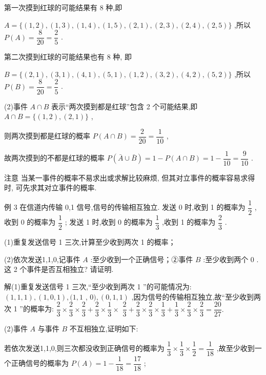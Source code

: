 第一次摸到红球的可能结果有 8 种,即

$A = \{ \left( {1,2}\right) ,\left( {1,3}\right) ,\left( {1,4}\right) ,\left( {1,5}\right) ,\left( {2,1}\right) ,\left( {2,3}\right) ,\left( {2,4}\right) ,\left( {2,5}\right) \}$ ,所以 $P\left( A\right)  = \dfrac{8}{20} = \dfrac{2}{5}$ .

第二次摸到红球的可能结果也有 8 种, 即

$B = \{ \left( {2,1}\right) ,\left( {3,1}\right) ,\left( {4,1}\right) ,\left( {5,1}\right) ,\left( {1,2}\right) ,\left( {3,2}\right) ,\left( {4,2}\right) ,\left( {5,2}\right) \}$ ,所以 $P\left( B\right)  = \dfrac{8}{20} = \dfrac{2}{5}$ .

(2)事件 $A \cap  B$ 表示“两次摸到都是红球”包含 2 个可能结果,即 $A \cap  B = \{ \left( {1,2}\right) ,\left( {2,1}\right) \}$ ,

则两次摸到都是红球的概率 $P\left( {A \cap  B}\right)  = \dfrac{2}{20} = \dfrac{1}{10}$ ,

故两次摸到的不都是红球的概率 $P\left( {\bar{A} \cup  \bar{B}}\right)  = 1 - P\left( {A \cap  B}\right)  = 1 - \dfrac{1}{10} = \dfrac{9}{10}$ .

注意 当某一事件的概率不易求出或求解比较麻烦, 但其对立事件的概率容易求得时, 可先求其对立事件的概率.

例 3 在信道内传输 0,1 信号,信号的传输相互独立. 发送 0 时,收到 1 的概率为 $\dfrac{1}{2}$ ,收到 0 的概率为 $\dfrac{1}{2}$ ; 发送 1 时,收到 0 的概率为 $\dfrac{1}{3}$ ,收到 1 的概率为 $\dfrac{2}{3}$ .

(1)重复发送信号 1 三次,计算至少收到两次 1 的概率；

(2)依次发送1,1,0,记事件 $A$ :至少收到一个正确信号；②事件 $B$ :至少收到两个 0 . 这 2 个事件是否互相独立? 请证明.

解(1)重复发送信号 1 三次,“至少收到两次 1 ”的可能情况为: $\left( {1,1,1}\right) ,\left( {1,0,1}\right) ,(1,1$ , $0),\left( {0,1,1}\right)$ ,因为信号的传输相互独立,故“至少收到两次 1 ”的概率为: $\dfrac{2}{3} \times  \dfrac{2}{3} \times  \dfrac{2}{3} + \dfrac{2}{3} \times  \dfrac{1}{3} \times$  $\dfrac{2}{3} + \dfrac{2}{3} \times  \dfrac{2}{3} \times  \dfrac{1}{3} + \dfrac{1}{3} \times  \dfrac{2}{3} \times  \dfrac{2}{3} = \dfrac{20}{27}.$

(2)事件 $A$ 与事件 $B$ 不互相独立,证明如下:

若依次发送1,1,0,则三次都没收到正确信号的概率为 $\dfrac{1}{3} \times  \dfrac{1}{3} \times  \dfrac{1}{2} = \dfrac{1}{18}$ ,故至少收到一个正确信号的概率为 $P\left( A\right)  = 1 - \dfrac{1}{18} = \dfrac{17}{18}$ ;

